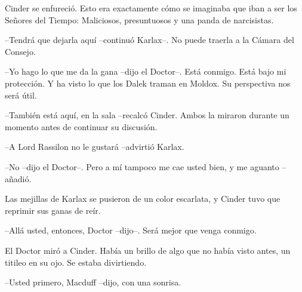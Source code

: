 Cinder se enfureció. Esto era exactamente cómo se imaginaba que iban a ser los Señores del Tiempo: Maliciosos, presuntuosos y una panda de narcisistas.

--Tendrá que dejarla aquí --continuó Karlax--. No puede traerla a la Cámara del Consejo.

--Yo hago lo que me da la gana --dijo el Doctor--. Está conmigo. Está bajo mi protección. Y ha visto lo que los Dalek traman en Moldox. Su perspectiva nos será útil.

--También está aquí, en la sala --recalcó Cinder. Ambos la miraron durante un momento antes de continuar su discusión.

--A Lord Rassilon no le gustará --advirtió Karlax.

--No --dijo el Doctor--. Pero a mí tampoco me cae usted bien, y me aguanto --añadió.

Las mejillas de Karlax se pusieron de un color escarlata, y Cinder tuvo que reprimir sus ganas de reír.

--Allá usted, entonces, Doctor --dijo--. Será mejor que venga conmigo.

El Doctor miró a Cinder. Había un brillo de algo que no había visto antes, un titileo en su ojo. Se estaba divirtiendo.

--Usted primero, Macduff --dijo, con una sonrisa.

